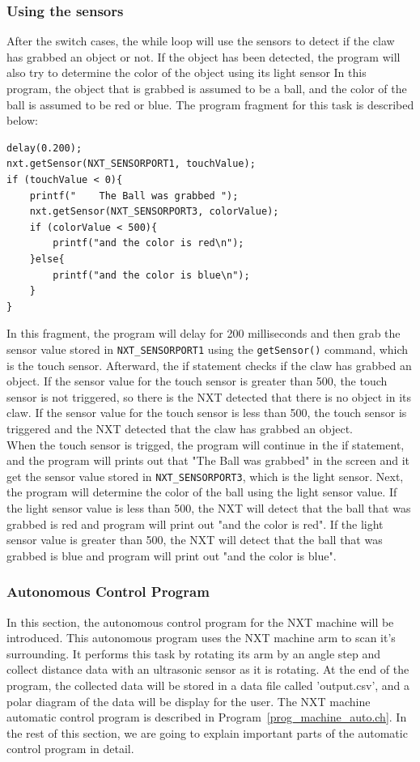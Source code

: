 \documentclass[11pt]{article}
\begin{document}
\subsubsection*{Using the sensors}
After the switch cases, the while loop will use the sensors to detect if the claw has grabbed an object or not.
If the object has been detected, the program will also try to determine the color of the object using its
light sensor In this program, the object that is grabbed is assumed to be a ball, and the color of the ball is 
assumed to be red or blue. The program fragment for this task is described below:
\begin{verbatim}
delay(0.200);
nxt.getSensor(NXT_SENSORPORT1, touchValue);
if (touchValue < 0){
    printf("    The Ball was grabbed ");
    nxt.getSensor(NXT_SENSORPORT3, colorValue);
    if (colorValue < 500){
        printf("and the color is red\n");
    }else{
        printf("and the color is blue\n");
    }
}
\end{verbatim}
In this fragment, the program will delay for 200 milliseconds and then grab the sensor value stored in
\verb+NXT_SENSORPORT1+ using the \verb+getSensor()+ command, which is the touch sensor. Afterward, the if 
statement checks if the claw has grabbed an object. If the sensor value for the touch sensor is greater 
than 500, the touch sensor is not triggered, so there is the NXT detected that there is no object in 
its claw. If the sensor value for the touch sensor is less than 500, the touch sensor is triggered and 
the NXT detected that the claw has grabbed an object. \\
\newline
When the touch sensor is trigged, the program will continue in the if statement, and the program will 
prints out that "The Ball was grabbed" in the screen and it get the sensor value stored in
\verb+NXT_SENSORPORT3+, which is the light sensor. Next, the program will determine the color of the ball 
using the light sensor value. If the light sensor value is less than 500, the NXT will detect that the 
ball that was grabbed is red and program will print out "and the color is red". If the light sensor 
value is greater than 500, the NXT will detect that the ball that was grabbed is blue and program will 
print out "and the color is blue". \\

\subsubsection{Autonomous Control Program}
In this section, the autonomous control program for the NXT machine will be introduced.
This autonomous program uses the NXT machine arm to scan it's surrounding. It performs 
this task by rotating its arm by an angle step and collect distance data with an 
ultrasonic sensor as it is rotating. At the end of the program, the collected data will be 
stored in a data file called 'output.csv', and a polar diagram of the data will be display 
for the user. The NXT machine automatic control program is described in 
Program~\ref{prog_machine_auto.ch}. In the rest of this section, we are going to explain 
important parts of the automatic control program in detail.
\end{document}
